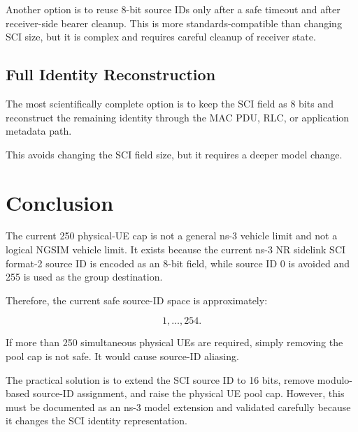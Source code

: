 \documentclass[11pt]{article}
\begin{document}
Another option is to reuse 8-bit source IDs only after a safe timeout and after receiver-side bearer cleanup. This is more standards-compatible than changing SCI size, but it is complex and requires careful cleanup of receiver state.

\subsection{Full Identity Reconstruction}

The most scientifically complete option is to keep the SCI field as 8 bits and reconstruct the remaining identity through the MAC PDU, RLC, or application metadata path.

This avoids changing the SCI field size, but it requires a deeper model change.

\section{Conclusion}

The current 250 physical-UE cap is not a general ns-3 vehicle limit and not a logical NGSIM vehicle limit. It exists because the current ns-3 NR sidelink SCI format-2 source ID is encoded as an 8-bit field, while source ID 0 is avoided and 255 is used as the group destination.

Therefore, the current safe source-ID space is approximately:

\[
1,\ldots,254.
\]

If more than 250 simultaneous physical UEs are required, simply removing the pool cap is not safe. It would cause source-ID aliasing.

The practical solution is to extend the SCI source ID to 16 bits, remove modulo-based source-ID assignment, and raise the physical UE pool cap. However, this must be documented as an ns-3 model extension and validated carefully because it changes the SCI identity representation.
\end{document}
